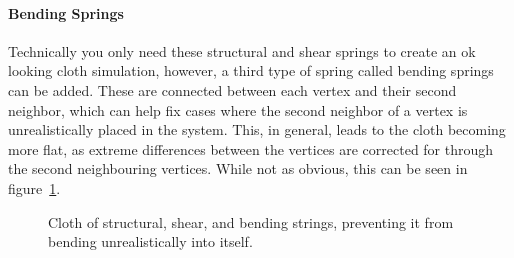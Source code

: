 \paragraph{Bending Springs}
Technically you only need these structural and shear springs to create an ok looking cloth simulation,
however, a third type of spring called bending springs can be added.
These are connected between each vertex and their second neighbor,
which can help fix cases where the second neighbor of a vertex is unrealistically placed in the system.
This, in general, leads to the cloth becoming more flat, as extreme differences between the vertices are corrected for
through the second neighbouring vertices\cite{jeff_lander_real_time_cloth}.
While not as obvious, this can be seen in figure~\ref{fig:bending_springs_collapsing}.
\begin{figure}[H]
    \centering
    \caption{Cloth of structural, shear, and bending strings, preventing it from bending unrealistically into itself.}
    \label{fig:bending_springs_collapsing}
\end{figure}

%

